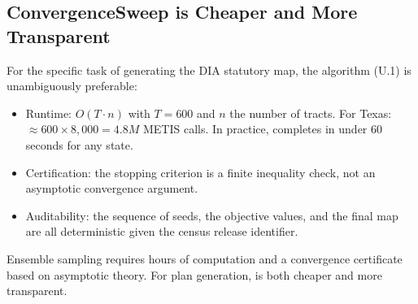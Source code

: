 \subsection{ConvergenceSweep is Cheaper and More Transparent}

For the specific task of generating the DIA statutory map,
the \cs{} algorithm (U.1) is unambiguously preferable:
\begin{itemize}
\item Runtime: $O(T \cdot n)$ with $T = 600$ and $n$ the number of tracts.
      For Texas: $\approx 600 \times 8{,}000 = 4.8M$ METIS calls.
      In practice, \cs{} completes in under 60 seconds for any state.
\item Certification: the stopping criterion is a finite inequality check,
      not an asymptotic convergence argument.
\item Auditability: the sequence of seeds, the objective values, and the
      final map are all deterministic given the census release identifier.
\end{itemize}

Ensemble sampling requires hours of computation and a convergence
certificate based on asymptotic theory.
For plan generation, \cs{} is both cheaper and more transparent.
